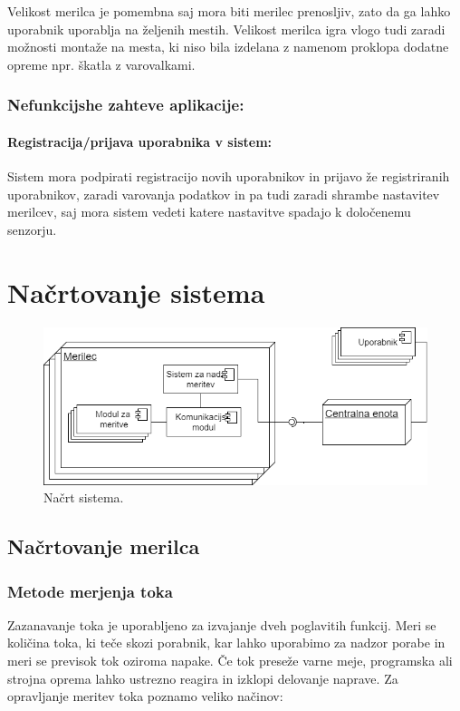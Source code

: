 \documentclass[12pt,a4paper,titlepage,openany]{report}
\begin{document}
Velikost merilca je pomembna saj mora biti merilec prenosljiv, zato da ga lahko uporabnik uporablja na željenih mestih. Velikost merilca igra vlogo tudi zaradi možnosti montaže na mesta, ki niso bila izdelana z namenom proklopa dodatne opreme npr. škatla z varovalkami. 

\subsection{Nefunkcijshe zahteve aplikacije:}


\subsubsection{Registracija/prijava uporabnika v sistem:}

Sistem mora podpirati registracijo novih uporabnikov in prijavo že registriranih uporabnikov, zaradi varovanja podatkov in pa tudi zaradi shrambe nastavitev merilcev, saj mora sistem vedeti katere nastavitve spadajo k določenemu senzorju.



\chapter{Načrtovanje sistema}
\thispagestyle{fancy}

\begin{figure}[H]
\begin{center}
\includegraphics[width=1\linewidth]{Slike/NacrtSistema.png}
\end{center}
\caption{Načrt sistema.}\label{slika:NacrtSistema}
\end{figure}

\section{Načrtovanje merilca}
\thispagestyle{fancy}

\subsection{Metode merjenja toka}
Zazanavanje toka je uporabljeno za izvajanje dveh poglavitih funkcij. Meri se količina toka, ki teče skozi porabnik, kar lahko uporabimo za nadzor porabe in meri se previsok tok oziroma napake. Če tok preseže varne meje, programska ali strojna oprema lahko ustrezno reagira in izklopi delovanje naprave. Za opravljanje meritev toka poznamo veliko načinov:
\end{document}
